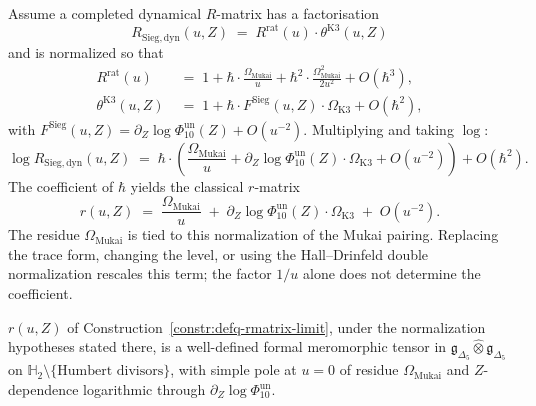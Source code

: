 \begin{construction}
\label{constr:defq-rmatrix-limit}
Assume a completed dynamical $R$-matrix has a factorisation
\[
 R_{\mathrm{Sieg,dyn}}(u, Z)
 \;=\;
 R^{\mathrm{rat}}(u)
 \cdot
 \theta^{\mathrm{K3}}(u, Z)
\]
and is normalized so that
\begin{align}
 R^{\mathrm{rat}}(u)
 &\;=\; 1 + \hbar\cdot\frac{\Omega_{\mathrm{Mukai}}}{u}
 + \hbar^2\cdot\frac{\Omega_{\mathrm{Mukai}}^2}{2u^2}
 + O(\hbar^3),
 \label{eq:defq-Rrat-expansion}\\
\theta^{\mathrm{K3}}(u, Z)
 &\;=\; 1 + \hbar\cdot
 F^{\mathrm{Sieg}}(u, Z)\cdot\Omega_{\mathrm{K3}}
 + O(\hbar^2),
 \label{eq:defq-thetaK3-expansion}
\end{align}
with $F^{\mathrm{Sieg}}(u, Z) = \partial_Z\log\Phi_{10}^{\mathrm{un}}(Z)
+ O(u^{-2})$. Multiplying and taking $\log$:
\begin{equation}
\label{eq:defq-logR-expansion}
 \log R_{\mathrm{Sieg,dyn}}(u, Z)
 \;=\;
 \hbar\cdot\!\left(
 \frac{\Omega_{\mathrm{Mukai}}}{u}
 + \partial_Z\log\Phi_{10}^{\mathrm{un}}(Z)\cdot\Omega_{\mathrm{K3}}
 + O(u^{-2})
 \right)
 + O(\hbar^2).
\end{equation}
The coefficient of $\hbar$ yields the classical
$r$-matrix
\begin{equation}
\label{eq:defq-classical-r}
 r(u, Z)
 \;=\;
 \frac{\Omega_{\mathrm{Mukai}}}{u}
 \;+\;
 \partial_Z\log\Phi_{10}^{\mathrm{un}}(Z)\cdot\Omega_{\mathrm{K3}}
 \;+\;
 O(u^{-2}).
\end{equation}
The residue \(\Omega_{\mathrm{Mukai}}\) is tied to this normalization
of the Mukai pairing. Replacing the trace form, changing the level, or
using the Hall--Drinfeld double normalization rescales this term; the
factor \(1/u\) alone does not determine the coefficient.
\end{construction}

\begin{proposition}
\label{prop:defq-C1-existence}
\ClaimStatusProvedHere
{}
$r(u, Z)$ of Construction~\ref{constr:defq-rmatrix-limit}, under the
normalization hypotheses stated there, is a well-defined formal
meromorphic tensor in
$\mathfrak g_{\Delta_5}\widehat\otimes\mathfrak g_{\Delta_5}$
on $\mathbb H_2\setminus\{\text{Humbert divisors}\}$, with simple pole
at $u = 0$ of residue $\Omega_{\mathrm{Mukai}}$ and $Z$-dependence
logarithmic through $\partial_Z\log\Phi_{10}^{\mathrm{un}}$.
\end{proposition}

